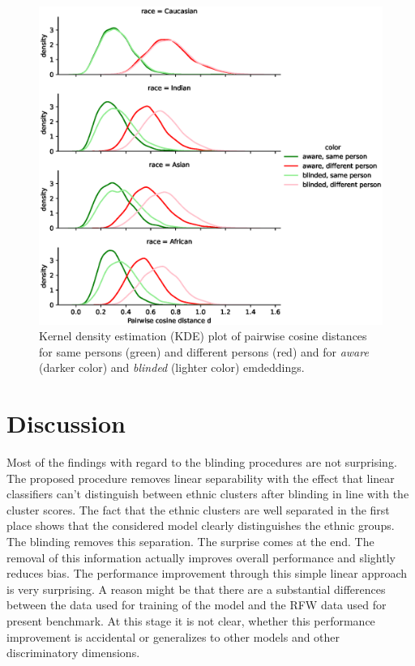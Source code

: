 \documentclass{report}
\begin{document}
\begin{figure}
  \includegraphics[width=\textwidth]{bias.eps}
  \caption{Kernel density estimation (KDE) plot of pairwise cosine distances for same persons (green) and different persons (red) and for  \emph{aware} (darker color) and  \emph{blinded} (lighter color) emdeddings.}
  \label{fig:frrate}
\end{figure}

\section{Discussion}

Most of the findings with regard to the blinding procedures are not surprising. The proposed procedure removes linear separability with the effect that linear classifiers can't distinguish between ethnic clusters after blinding in line with the cluster scores. The fact that the ethnic clusters are well separated in the first place shows that the considered model clearly distinguishes the ethnic groups. The blinding removes this separation. The surprise comes at the end. The removal of this information actually improves overall performance and slightly reduces bias. The performance improvement through this simple linear approach is very surprising. A reason might be that there are a substantial differences between the data used for training of the model and the RFW data used for present benchmark. At this stage it is not clear, whether this performance improvement is accidental or generalizes to other models and other discriminatory dimensions.
\end{document}
